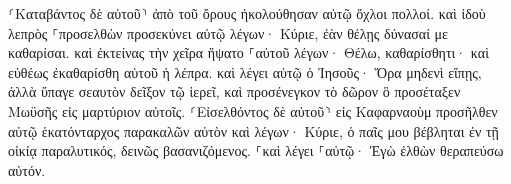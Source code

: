 \documentclass{openreader}
\begin{document}
⸂Καταβάντος δὲ αὐτοῦ⸃ ἀπὸ τοῦ ὄρους ἠκολούθησαν αὐτῷ ὄχλοι πολλοί. 
καὶ ἰδοὺ λεπρὸς ⸀προσελθὼν προσεκύνει αὐτῷ λέγων· Κύριε, ἐὰν θέλῃς δύνασαί με καθαρίσαι. 
καὶ ἐκτείνας τὴν χεῖρα ἥψατο ⸀αὐτοῦ λέγων· Θέλω, καθαρίσθητι· καὶ εὐθέως ἐκαθαρίσθη αὐτοῦ ἡ λέπρα. 
καὶ λέγει αὐτῷ ὁ Ἰησοῦς· Ὅρα μηδενὶ εἴπῃς, ἀλλὰ ὕπαγε σεαυτὸν δεῖξον τῷ ἱερεῖ, καὶ προσένεγκον τὸ δῶρον ὃ προσέταξεν Μωϋσῆς εἰς μαρτύριον αὐτοῖς. 
⸂Εἰσελθόντος δὲ αὐτοῦ⸃ εἰς Καφαρναοὺμ προσῆλθεν αὐτῷ ἑκατόνταρχος παρακαλῶν αὐτὸν 
καὶ λέγων· Κύριε, ὁ παῖς μου βέβληται ἐν τῇ οἰκίᾳ παραλυτικός, δεινῶς βασανιζόμενος. 
⸀καὶ λέγει ⸀αὐτῷ· Ἐγὼ ἐλθὼν θεραπεύσω αὐτόν. 
\end{document}
